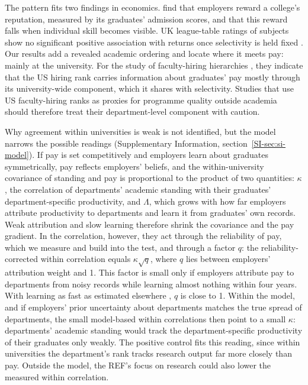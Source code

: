 \documentclass[11pt]{article}
\newcommand{\SIsec}[1]{Supplementary Information, section~\ref{SI-#1}}
\begin{document}
The pattern fits two findings in economics. \citet{macleod2017big} find that employers reward a college's
reputation, measured by its graduates' admission scores, and that this reward falls when individual skill becomes
visible. UK
league-table ratings of subjects show no significant positive association with returns once selectivity is held
fixed \citep{britton2022how}. Our results add a revealed academic ordering and locate where it meets pay: mainly at
the university. For the study of faculty-hiring hierarchies \citep{clauset2015systematic, wapman2022quantifying, morgan2022socioeconomic},
they indicate that the US hiring rank carries information about graduates' pay mostly through its university-wide
component, which it shares with selectivity. Studies that use US faculty-hiring ranks as proxies for programme quality
outside academia should therefore treat their department-level component with caution.

Why agreement within universities is weak is not identified, but the model narrows the possible readings
(\SIsec{sec:si-model}). If pay is set competitively and employers learn about graduates symmetrically, pay reflects
employers' beliefs, and the within-university covariance of standing and pay is proportional to the product of two
quantities: $\kappa$, the correlation of departments' academic standing with their graduates' department-specific
productivity, and $\Lambda$, which grows with how far employers attribute productivity to departments and learn it
from graduates' own records. Weak attribution and slow learning therefore shrink the covariance and the pay gradient.
In the correlation, however, they act through the reliability of pay, which we measure and build into the test, and
through a factor $q$: the reliability-corrected within correlation equals $\kappa\sqrt{q}$, where $q$ lies between
employers' attribution weight and 1. This factor is small only if employers attribute pay to departments from noisy
records while learning almost nothing within four years. With learning as fast as estimated elsewhere
\citep{lange2007speed, arcidiacono2010beyond}, $q$ is close to 1. Within the model, and if employers' prior uncertainty
about departments matches the true spread of departments, the small model-based within correlations then point to a
small $\kappa$: departments' academic standing would track the department-specific productivity of their graduates
only weakly. The positive control fits this reading, since within universities the department's rank tracks research
output far more closely than pay. Outside the model, the REF's focus on research could also lower the measured within correlation.
\end{document}
